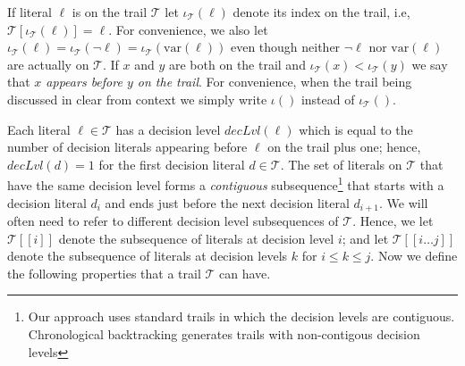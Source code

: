 \documentclass[runningheads]{llncs}
\newcommand{\trail}{\ensuremath{\mathcal{T}}}
\newcommand{\trailIdxT}[2]{\ensuremath{\iota_{#1}(#2)}}
\newcommand{\trailIdx}[1]{\ensuremath{\iota(#1)}}
\newcommand{\range}[2]{#1\ldots#2}
\newcommand{\dlevel}[1]{\ensuremath{\mathit{decLvl}(#1)}}
\newcommand{\var}{\text{var}}
\begin{document}
If literal $\ell$ is on the trail $\trail$ let
$\trailIdxT{\trail}{\ell}$ denote its index on the trail, i.e,
$\trail[\trailIdxT{\trail}{\ell}] = \ell$. For convenience, we also let
$\trailIdxT{\trail}{\ell} = \trailIdxT{\trail}{\lnot \ell} =
\trailIdxT{\trail}{\var(\ell)}$ even though neither $\lnot \ell$ nor
$\var(\ell)$ are actually on $\trail$. If $x$ and $y$ are both on the
trail and $\trailIdxT{\trail}{x} < \trailIdxT{\trail}{y}$ we say that
\textit{$x$ appears before $y$ on the trail}. For convenience, when
the trail being discussed in clear from context we simply write
$\trailIdx{}$ instead of $\trailIdxT{\trail}{}$.

Each literal $\ell\in\trail$ has a decision level $\dlevel{\ell}$
which is equal to the number of decision literals appearing before
$\ell$ on the trail plus one; hence, $\dlevel{d}=1$ for the first
decision literal $d\in\trail$. The set of literals on $\trail$ that
have the same decision level forms a \emph{contiguous}
subsequence\footnote{Our approach uses standard trails in which the
  decision levels are contiguous. Chronological backtracking
  \cite{DBLP:conf/lpar/JiangZ13,DBLP:conf/sat/NadelR18,DBLP:conf/sat/MohleB19}
  generates trails with non-contigous decision levels} that starts
with a decision literal $d_i$ and ends just before the next decision
literal $d_{i+1}$. We will often need to refer to different decision
level subsequences of $\trail$. Hence, we let $\trail[[i]]$ denote the
subsequence of literals at decision level $i$; and let
$\trail[[\range{i}{j}]]$ denote the subsequence of literals at
decision levels $k$ for $i\leq k\leq j$. Now we define the
following properties that a trail $\trail$ can have.
\end{document}
